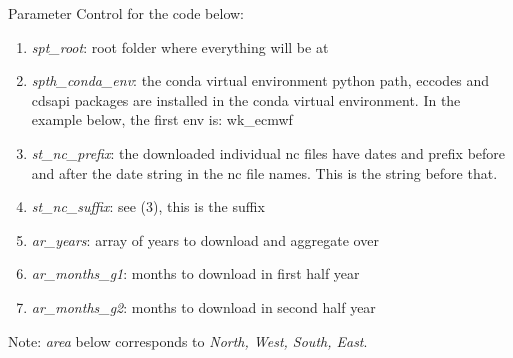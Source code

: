 \documentclass[
]{book}
\providecommand{\tightlist}{%
  \setlength{\itemsep}{0pt}\setlength{\parskip}{0pt}}
\begin{document}
Parameter Control for the code below:

\begin{enumerate}
\def\labelenumi{\arabic{enumi}.}
\tightlist
\item
  \emph{spt\_root}: root folder where everything will be at
\item
  \emph{spth\_conda\_env}: the conda virtual environment python path, eccodes and cdsapi packages are installed in the conda virtual environment. In the example below, the first env is: wk\_ecmwf
\item
  \emph{st\_nc\_prefix}: the downloaded individual nc files have dates and prefix before and after the date string in the nc file names. This is the string before that.
\item
  \emph{st\_nc\_suffix}: see (3), this is the suffix
\item
  \emph{ar\_years}: array of years to download and aggregate over
\item
  \emph{ar\_months\_g1}: months to download in first half year
\item
  \emph{ar\_months\_g2}: months to download in second half year
\end{enumerate}

Note: \emph{area} below corresponds to \emph{North, West, South, East}.
\end{document}
